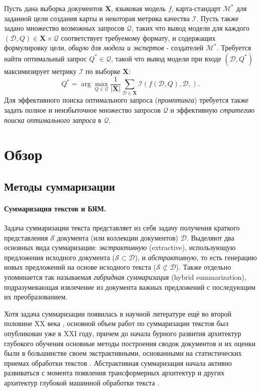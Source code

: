 \documentclass[12pt]{article}
\newcommand{\X}{\mathbf{X}}
\newcommand{\D}{\mathcal{D}}
\newcommand{\M}{\mathcal{M}}
\newcommand{\I}{\mathcal{I}}
\newcommand{\Q}{\mathcal{Q}}
\renewcommand{\S}{\mathcal{S}}
\begin{document}
Пусть дана выборка документов $\X$, языковая модель $f$, карта-стандарт $\M^*$ для заданной цели создания карты и некоторая метрика качества $\I$. Пусть также задано множество возможных запросов $\Q$, таких что вывод модели для каждого $(\D, Q)\in\X\times\Q$ соответствует требуемому формату, и содержащих формулировку цели, \textit{общую для модели и экспертов} - создателей $\M^*$. Требуется найти оптимальный запрос $Q^*\in\Q$, такой что вывод модели при входе $(\D, Q^*)$ максимизирует метрику $\I$ по выборке $\X$:
$$
Q^* = \arg\max\limits_{Q\in\Q} \frac{1}{|\X|}\sum\limits_{\D\in\X} \I(f(\D, Q), \D, ).
$$
Для эффективного поиска оптимального запроса (\textit{промптинга}) требуется также задать полное и неизбыточное множество запросов $\Q$ и эффективную \textit{стратегию поиска оптимального запроса} в $\Q$.

\newpage
\section{Обзор}
\subsection{Методы суммаризации}

\paragraph{Суммаризация текстов и БЯМ.} Задача суммаризации текста представляет из себя задачу получения краткого представления $\S$ документа (или коллекции документов) $\D$. Выделяют два основных вида суммаризации: \textit{экстрактивную} (extractive), использующую предложения исходного документа ($\S\subset\D$), и \textit{абстрактивную}, то есть генерацию новых предложений на основе исходного текста ($\S\not\subset\D$). Также отдельно упоминается так называемая \textit{гибридная суммаризация} (hybrid summarization), подразумевающая извлечение из документа важных предложений с последующим их преобразованием. 

Хотя задача суммаризации появилась в научной литературе ещё во второй половине XX века \cite{luhn1958automatic}, основной объем работ по суммаризации текстов был опубликован уже в XXI году, причем до начала бурного развития архитектур глубокого обучения основные методы построения сводок документов и их оценки были в большинстве своем экстрактивными, основанными на статистических приемах обработки текстов \cite{allahyari2017text}. Абстрактивная суммаризация начала активно развиваться с момента появления трансформерных архитектур и других архитектур глубокой машинной обработки текста \cite{el2021automatic}. 
\end{document}
